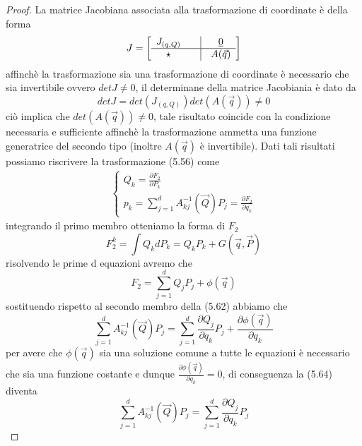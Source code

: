 \begin{proof}
La matrice Jacobiana associata alla trasformazione di coordinate \`{e} della forma 
\begin{align}
J = 
\left [\begin{array}{ccc}
	J_{(q,Q)} & \quad \vline & \underline{0}\\
	\hline 
	\star & \quad \vline &A(\vec{q})\\
\end{array}\right ]
\end{align} 
affinch\`{e} la trasformazione sia una trasformazione di coordinate \`{e} necessario che sia invertibile ovvero $detJ \neq 0$, il determinane della matrice  Jacobiania \`{e} dato da 
\begin{equation}
	detJ = det (J_{(q,Q)})det(A(\vec{q})) \neq 0
\end{equation}
ci\`{o} implica che $det(A(\vec{q})) \neq 0$, tale risultato coincide con la condizione necessaria e sufficiente affinch\`{e} la trasformazione ammetta una funzione generatrice del secondo tipo (inoltre $A(\vec{q})$ \`{e} invertibile).
Dati tali risultati possiamo riscrivere la trasformazione (5.56) come 
\begin{align}
	\begin{cases}
		Q_k = \frac{\partial F_2}{\partial P_k}\\
		p_k = \sum_{j=1}^{d} A^{-1}_{kj}(\vec{Q})P_j = \frac{\partial F_2}{\partial q_k} 
	\end{cases}
\end{align}
integrando il primo membro otteniamo la forma di $F_2$
\begin{equation}
	F_{2}^{k} = \int Q_kdP_k = Q_kP_k + G(\vec{q},\vec{P})
\end{equation}
risolvendo le prime d equazioni avremo che 
\begin{equation}
	F_2 = \sum_{j=1}^{d} Q_jP_j + \phi(\vec{q})
\end{equation}
sostituendo rispetto al secondo membro della (5.62) abbiamo che 
\begin{equation}
	\sum_{j=1}^{d} A^{-1}_{kj}(\vec{Q})P_j = \sum_{j=1}^d \frac{\partial Q_j}{\partial q_k}P_j + \frac{\partial \phi(\vec {q})}{\partial q_k}  
\end{equation}
per avere che $\phi (\vec{q})$ sia una soluzione comune a tutte le equazioni \`{e} necessario che sia una funzione costante e dunque $\frac{\partial \phi(\vec {q})}{\partial q_k} = 0$, di conseguenza la (5.64) diventa 
\begin{equation}
	\sum_{j=1}^{d} A^{-1}_{kj}(\vec{Q})P_j = \sum_{j=1}^d\frac{\partial Q_j}{\partial q_k}P_j 

\end{equation}
\end{proof}
